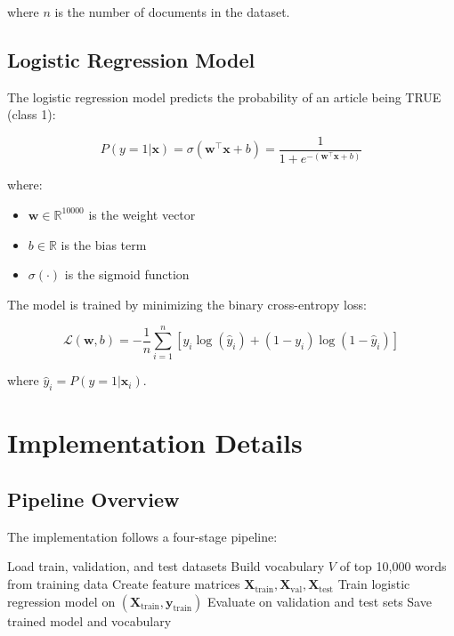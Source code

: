 \documentclass[11pt,a4paper]{article}
\begin{document}
where $n$ is the number of documents in the dataset.

\subsection{Logistic Regression Model}

The logistic regression model predicts the probability of an article being TRUE (class 1):

\begin{equation}
P(y=1 | \mathbf{x}) = \sigma(\mathbf{w}^\top \mathbf{x} + b) = \frac{1}{1 + e^{-(\mathbf{w}^\top \mathbf{x} + b)}}
\end{equation}

where:
\begin{itemize}
    \item $\mathbf{w} \in \mathbb{R}^{10000}$ is the weight vector
    \item $b \in \mathbb{R}$ is the bias term
    \item $\sigma(\cdot)$ is the sigmoid function
\end{itemize}

The model is trained by minimizing the binary cross-entropy loss:

\begin{equation}
\mathcal{L}(\mathbf{w}, b) = -\frac{1}{n}\sum_{i=1}^{n} \left[ y_i \log(\hat{y}_i) + (1-y_i)\log(1-\hat{y}_i) \right]
\end{equation}

where $\hat{y}_i = P(y=1 | \mathbf{x}_i)$.

\section{Implementation Details}

\subsection{Pipeline Overview}

The implementation follows a four-stage pipeline:

\begin{algorithm}
\caption{Fake News Detection Pipeline}
\begin{algorithmic}[1]
\State Load train, validation, and test datasets
\State Build vocabulary $V$ of top 10,000 words from training data
\State Create feature matrices $\mathbf{X}_{\text{train}}, \mathbf{X}_{\text{val}}, \mathbf{X}_{\text{test}}$
\State Train logistic regression model on $(\mathbf{X}_{\text{train}}, \mathbf{y}_{\text{train}})$
\State Evaluate on validation and test sets
\State Save trained model and vocabulary
\end{algorithmic}
\end{algorithm}
\end{document}
